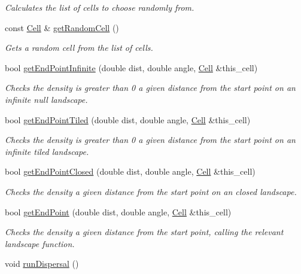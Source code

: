 \begin{DoxyCompactItemize}
\begin{DoxyCompactList}\small\item\em Calculates the list of cells to choose randomly from. \end{DoxyCompactList}\item 
const \hyperlink{struct_cell}{Cell} \& \hyperlink{class_simulate_dispersal_a7d0a2b28dd8d45f1b8a74dbcd82290e7}{get\+Random\+Cell} ()
\begin{DoxyCompactList}\small\item\em Gets a random cell from the list of cells. \end{DoxyCompactList}\item 
bool \hyperlink{class_simulate_dispersal_a4bfedd82e07504c831d98c1024da5830}{get\+End\+Point\+Infinite} (double dist, double angle, \hyperlink{struct_cell}{Cell} \&this\+\_\+cell)
\begin{DoxyCompactList}\small\item\em Checks the density is greater than 0 a given distance from the start point on an infinite null landscape. \end{DoxyCompactList}\item 
bool \hyperlink{class_simulate_dispersal_ab82cd31c46619084c381ab2904e8b7f3}{get\+End\+Point\+Tiled} (double dist, double angle, \hyperlink{struct_cell}{Cell} \&this\+\_\+cell)
\begin{DoxyCompactList}\small\item\em Checks the density is greater than 0 a given distance from the start point on an infinite tiled landscape. \end{DoxyCompactList}\item 
bool \hyperlink{class_simulate_dispersal_aa37e909fe4b80b40adc859ef4d7e4eac}{get\+End\+Point\+Closed} (double dist, double angle, \hyperlink{struct_cell}{Cell} \&this\+\_\+cell)
\begin{DoxyCompactList}\small\item\em Checks the density a given distance from the start point on an closed landscape. \end{DoxyCompactList}\item 
bool \hyperlink{class_simulate_dispersal_a2199ae28beb4cb7c705fe5fe02de385f}{get\+End\+Point} (double dist, double angle, \hyperlink{struct_cell}{Cell} \&this\+\_\+cell)
\begin{DoxyCompactList}\small\item\em Checks the density a given distance from the start point, calling the relevant landscape function. \end{DoxyCompactList}\item 
void \hyperlink{class_simulate_dispersal_ac537bace4adfe905ee5f0435cd18d51e}{run\+Dispersal} ()\hypertarget{class_simulate_dispersal_ac537bace4adfe905ee5f0435cd18d51e}{}\label{class_simulate_dispersal_ac537bace4adfe905ee5f0435cd18d51e}


\end{DoxyCompactItemize}
